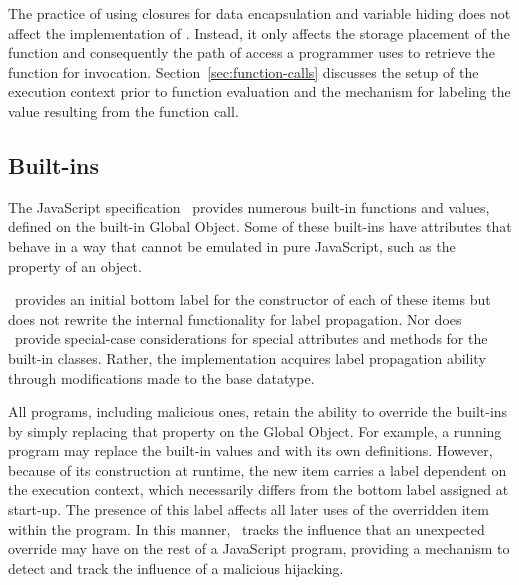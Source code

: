The practice of using closures for data encapsulation and variable hiding does not affect the implementation of \FlowCore.
Instead, it only affects the storage placement of the function and consequently the path of access a programmer uses to retrieve the function for invocation.
Section~\ref{sec:function-calls} discusses the setup of the execution context prior to function evaluation and the mechanism for labeling the value resulting from the function call.

\subsection{Built-ins}

\begin{comment}
 - what to do with arrays, or does this fit better in design considerations?
   : Can coalesce labels on arrays?
   : label bounds checking?
 - object poisoning attack
\end{comment}

The JavaScript specification~\cite{ecma} provides numerous built-in functions and values, defined on the built-in Global Object.
Some of these built-ins have attributes that behave in a way that cannot be emulated in pure JavaScript, such as the  property of an  object.

\FlowCore\ provides an initial bottom label for the constructor of each of these items but does not rewrite the internal functionality for label propagation.
Nor does \FlowCore\ provide special-case considerations for special attributes and methods for the built-in classes.
Rather, the implementation acquires label propagation ability through modifications made to the base  datatype.

All programs, including malicious ones, retain the ability to override the built-ins by simply replacing that property on the Global Object.
For example, a running program may replace the built-in values  and  with its own definitions.
However, because of its construction at runtime, the new item carries a label dependent on the execution context, which necessarily differs from the bottom label assigned at start-up.
The presence of this label affects all later uses of the overridden item within the program.
In this manner, \FlowCore\ tracks the influence that an unexpected override may have on the rest of a JavaScript program, providing a mechanism to detect and track the influence of a malicious hijacking.


